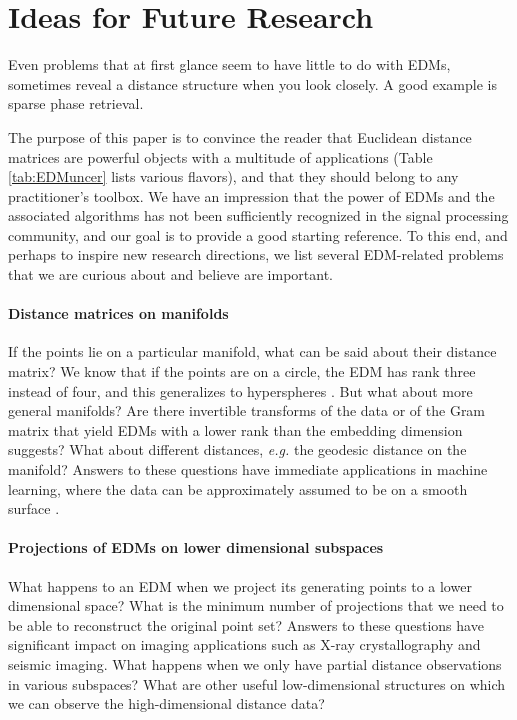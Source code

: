 \documentclass[10pt,double]{IEEEtran}
\begin{document}
\section{Ideas for Future Research} \label{sec:ideas_for_future_research}

Even problems that at first glance seem to have little to do with EDMs,
sometimes reveal a distance structure when you look closely. A good example is
sparse phase retrieval.

The purpose of this paper is to convince the reader that Euclidean distance
matrices are powerful objects with a multitude of applications (Table
\ref{tab:EDMuncer} lists various flavors), and that they should belong to any
practitioner's toolbox. We have an impression that the power of EDMs and the
associated algorithms has not been sufficiently recognized in the signal
processing community, and our goal is to provide a good starting reference. To
this end, and perhaps to inspire new research directions, we list several
EDM-related problems that we are curious about and believe are important.

\paragraph{Distance matrices on manifolds} If the points lie on a particular
manifold, what can be said about their distance matrix? We know that if the
points are on a circle, the EDM has rank three instead of four, and this
generalizes to hyperspheres \cite{gower1}. But what about more general
manifolds? Are there invertible transforms of the data or of the Gram matrix
that yield EDMs with a lower rank than the embedding dimension suggests? What
about different distances, \emph{e.g.} the geodesic distance on the manifold? Answers
to these questions have immediate applications in machine learning, where the
data can be approximately assumed to be on a smooth surface
\cite{Tenenbaum2000}.


\paragraph{Projections of EDMs on lower dimensional subspaces} What happens
to an EDM when we project its generating points to a lower dimensional space?
What is the minimum number of projections that we need to be able to
reconstruct the original point set? Answers to these questions have
significant impact on imaging applications such as X-ray crystallography and
seismic imaging. What happens when we only have partial distance observations
in various subspaces? What are other useful low-dimensional structures on
which we can observe the high-dimensional distance data?
\end{document}
